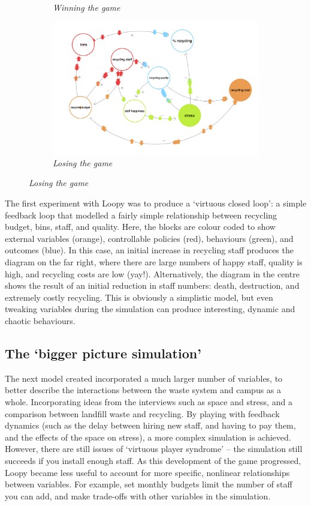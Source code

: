 \documentclass[nofonts,nols,justified,nobib]{tufte-book}
\begin{document}
\begin{figure}
\begin{subfigure}{.3\textwidth}
\caption{\textit{Winning the game}}
  \label{small:win}
\end{subfigure}%
\quad
\begin{subfigure}{.3\textwidth}
  \centering
  \includegraphics[width=1\linewidth]{img/3/loopy/small-lose.png}
  \caption{\textit{Losing the game}}
  \label{small:lose}
\end{subfigure}%
\end{figure}
\vspace{0.8cm}

The first experiment with Loopy was to produce a `virtuous closed loop': a simple feedback loop that modelled a fairly simple relationship between recycling budget, bins, staff, and quality. Here, the blocks are colour coded to show external variables (orange), controllable policies (red), behaviours (green), and outcomes (blue). In this case, an initial increase in recycling staff produces the diagram on the far right, where there are large numbers of happy staff, quality is high, and recycling costs are low (yay!). Alternatively, the diagram in the centre shows the result of an initial reduction in staff numbers: death, destruction, and extremely costly recycling. This is obviously a simplistic model, but even tweaking variables during the simulation can produce interesting, dynamic and chaotic behaviours.


\subsection*{The `bigger picture simulation’}

The next model created incorporated a much larger number of variables, to better describe the interactions between the waste system and campus as a whole. Incorporating ideas from the interviews such as space and stress, and a comparison between landfill waste and recycling. By playing with feedback dynamics (such as the delay between hiring new staff, and having to pay them, and the effects of the space on stress), a more complex simulation is achieved. However, there are still issues of `virtuous player syndrome' -- the simulation still succeeds if you install enough staff. As this development of the game progressed, Loopy became less useful to account for more specific, nonlinear relationships between variables. For example, set monthly budgets limit the number of staff you can add, and make trade-offs with other variables in the simulation.
\end{document}
